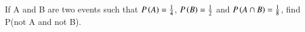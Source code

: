 \begin{flushleft}
If A and B are two events such that $P\left(A\right) = \frac{1}{4}$, $P\left(B\right) = \frac{1}{2}$ and $P\left(A \cap B\right) = \frac{1}{8}$, find P(not A and not B).
\end{flushleft}